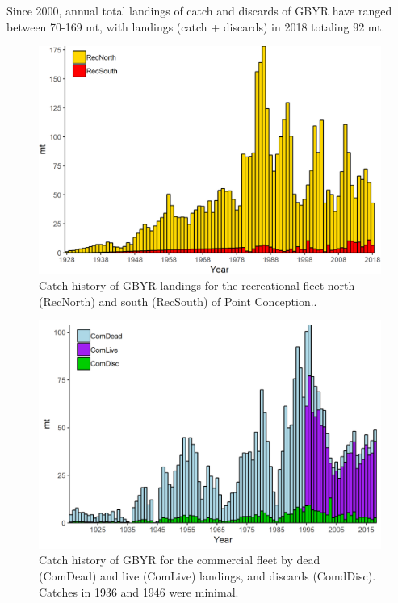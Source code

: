 \documentclass[12pt,]{article}
\begin{document}
Since 2000, annual total landings of catch and discards of GBYR have
ranged between 70-169 mt, with landings (catch + discards) in 2018
totaling 92 mt.

\FloatBarrier

\begin{figure}
\centering
\includegraphics{Figures/rec_exec.png}
\caption{Catch history of GBYR landings for the recreational fleet north
(RecNorth) and south (RecSouth) of Point Conception..
\label{fig:Exec_catch1}}
\end{figure}

\begin{figure}
\centering
\includegraphics{Figures/comm_exec.png}
\caption{Catch history of GBYR for the commercial fleet by dead
(ComDead) and live (ComLive) landings, and discards (ComdDisc). Catches
in 1936 and 1946 were minimal. \label{fig:Exec_catch2}}
\end{figure}
\end{document}
